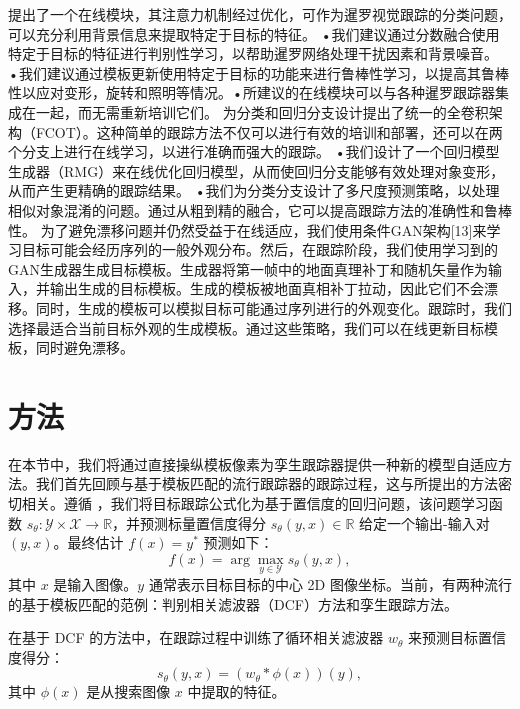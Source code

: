 \cite{DiscriminativeAnd} 提出了一个在线模块，其注意力机制经过优化，可作为暹罗视觉跟踪的分类问题，可以充分利用背景信息来提取特定于目标的特征。 •我们建议通过分数融合使用特定于目标的特征进行判别性学习，以帮助暹罗网络处理干扰因素和背景噪音。 •我们建议通过模板更新使用特定于目标的功能来进行鲁棒性学习，以提高其鲁棒性以应对变形，旋转和照明等情况。•所建议的在线模块可以与各种暹罗跟踪器集成在一起，而无需重新培训它们。%
\cite{FCOT} 为分类和回归分支设计提出了统一的全卷积架构（FCOT）。这种简单的跟踪方法不仅可以进行有效的培训和部署，还可以在两个分支上进行在线学习，以进行准确而强大的跟踪。 •我们设计了一个回归模型生成器（RMG）来在线优化回归模型，从而使回归分支能够有效处理对象变形，从而产生更精确的跟踪结果。 •我们为分类分支设计了多尺度预测策略，以处理相似对象混淆的问题。通过从粗到精的融合，它可以提高跟踪方法的准确性和鲁棒性。 %
\cite{TGGAN} 为了避免漂移问题并仍然受益于在线适应，我们使用条件GAN架构[13]来学习目标可能会经历序列的一般外观分布。然后，在跟踪阶段，我们使用学习到的GAN生成器生成目标模板。生成器将第一帧中的地面真理补丁和随机矢量作为输入，并输出生成的目标模板。生成的模板被地面真相补丁拉动，因此它们不会漂移。同时，生成的模板可以模拟目标可能通过序列进行的外观变化。跟踪时，我们选择最适合当前目标外观的生成模板。通过这些策略，我们可以在线更新目标模板，同时避免漂移。%

\section{方法}
在本节中，我们将通过直接操纵模板像素为孪生跟踪器提供一种新的模型自适应方法。我们首先回顾与基于模板匹配的流行跟踪器的跟踪过程，这与所提出的方法密切相关。遵循 \cite{Danelljan_2020_CVPR}，我们将目标跟踪公式化为基于置信度的回归问题，该问题学习函数 $s_\theta:\mathcal{Y\times X\rightarrow \mathbb R}$，并预测标量置信度得分 $s_\theta(y,x)\in\mathbb R$ 给定一个输出-输入对 $(y,x)$。最终估计 $f(x)=y^*$ 预测如下：
\begin{equation}
    f(x) = \arg\max_{y\in \mathcal Y}s_\theta (y,x),
\end{equation}
其中 $x$ 是输入图像。$y$ 通常表示目标目标的中心 2D 图像坐标。当前，有两种流行的基于模板匹配的范例：判别相关滤波器（DCF）方法和孪生跟踪方法。

在基于 DCF 的方法中，在跟踪过程中训练了循环相关滤波器 $w_{\theta}$ 来预测目标置信度得分：
\begin{equation}
    s_\theta(y,x)=(w_\theta * \phi(x))(y),
    \label{equ:dcf}
\end{equation}
其中 $\phi(x)$ 是从搜索图像 $x$ 中提取的特征。

